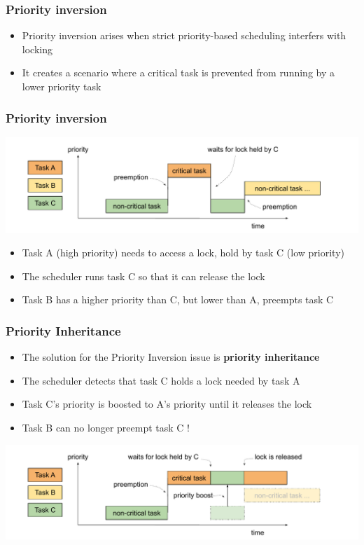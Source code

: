 \begin{frame}
  \frametitle{Priority inversion}
	\begin{itemize}
		\item Priority inversion arises when strict priority-based scheduling interfers with locking
		\item It creates a scenario where a critical task is
		      prevented from running by a lower priority task
	\end{itemize}
\end{frame}

\begin{frame}
  \frametitle{Priority inversion}
	\includegraphics[height=0.5\textheight]{slides/realtime-linux-realtime-systems/priority_inversion.pdf}
	\begin{itemize}
		\item Task A (high priority) needs to access a lock, hold by task C (low priority)
		\item The scheduler runs task C so that it can release the lock
		\item Task B has a higher priority than C, but lower than A, preempts task C
	\end{itemize}
\end{frame}

\begin{frame}
  \frametitle{Priority Inheritance}
	\begin{itemize}
		\item The solution for the Priority Inversion issue is \textbf{priority inheritance}
		\item The scheduler detects that task C holds a lock needed by task A
		\item Task C's priority is boosted to A's priority until it releases the lock
		\item Task B can no longer preempt task C !
	\end{itemize}
	\includegraphics[height=0.5\textheight]{slides/realtime-linux-realtime-systems/priority_inheritance.pdf}
\end{frame}

